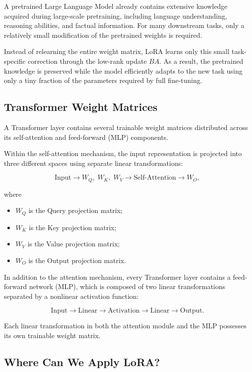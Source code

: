 A pretrained Large Language Model already contains extensive knowledge acquired during large-scale pretraining, including language understanding, reasoning abilities, and factual information. For many downstream tasks, only a relatively small modification of the pretrained weights is required.

Instead of relearning the entire weight matrix, LoRA learns only this small task-specific correction through the low-rank update \(BA\). As a result, the pretrained knowledge is preserved while the model efficiently adapts to the new task using only a tiny fraction of the parameters required by full fine-tuning.
\subsection*{Transformer Weight Matrices}

A Transformer layer contains several trainable weight matrices distributed across its self-attention and feed-forward (MLP) components.

Within the self-attention mechanism, the input representation is projected into three different spaces using separate linear transformations:

\[
\text{Input}
\longrightarrow
W_Q,\;W_K,\;W_V
\longrightarrow
\text{Self-Attention}
\longrightarrow
W_O,
\]

where

\begin{itemize}
    \item $W_Q$ is the Query projection matrix;
    \item $W_K$ is the Key projection matrix;
    \item $W_V$ is the Value projection matrix;
    \item $W_O$ is the Output projection matrix.
\end{itemize}

In addition to the attention mechanism, every Transformer layer contains a feed-forward network (MLP), which is composed of two linear transformations separated by a nonlinear activation function:

\[
\text{Input}
\longrightarrow
\text{Linear}
\longrightarrow
\text{Activation}
\longrightarrow
\text{Linear}
\longrightarrow
\text{Output}.
\]

Each linear transformation in both the attention module and the MLP possesses its own trainable weight matrix.


\subsection*{Where Can We Apply LoRA?}

